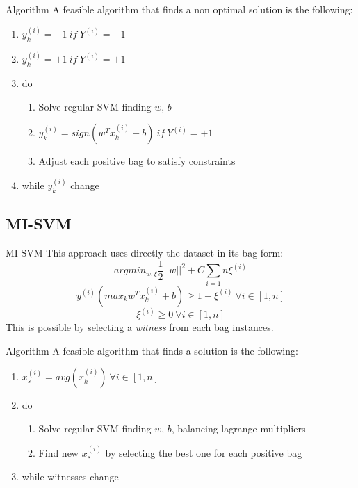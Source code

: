 \begin{frame}{Algorithm}
	A feasible algorithm that finds a non optimal solution is the following:
	\begin{enumerate}
		\item $y_k^{(i)} = -1 \ if \ Y^{(i)} = -1$
		\item $y_k^{(i)} = +1 \ if \ Y^{(i)} = +1$
		\item do
		\begin{enumerate}
			\item Solve regular SVM finding $w$, $b$
			\item $y_k^{(i)} = sign(w^T x_k^{(i)} + b) \ if \ Y^{(i)} = +1$
			\item Adjust each positive bag to satisfy constraints
		\end{enumerate}
		\item while $y_k^{(i)}$ change
	\end{enumerate}
\end{frame}

\subsection{MI-SVM}
\begin{frame}{MI-SVM}
	This approach uses directly the dataset in its bag form:
	$$arg min_{w, \xi} \frac{1}{2} ||w||^2 + C \sum_{i = 1}{n}\xi^{(i)}$$
	$$y^{(i)} (max_k w^T x_k^{(i)} + b) \geq 1 - \xi^{(i)} \ \forall i \in [1, n]$$
	$$\xi^{(i)} \geq 0 \ \forall i \in [1, n]$$
	This is possible by selecting a \textit{witness} from each bag instances.
\end{frame}

\begin{frame}{Algorithm}
	A feasible algorithm that finds a solution is the following:
	\begin{enumerate}
		\item $x_s^{(i)} = avg(x_k^{(i)}) \ \forall i \in [1, n]$
		\item do
		\begin{enumerate}
			\item Solve regular SVM finding $w$, $b$, balancing lagrange multipliers
			\item Find new $x_s^{(i)}$ by selecting the best one for each positive bag
		\end{enumerate}
		\item while witnesses change
	\end{enumerate}
\end{frame}

 
